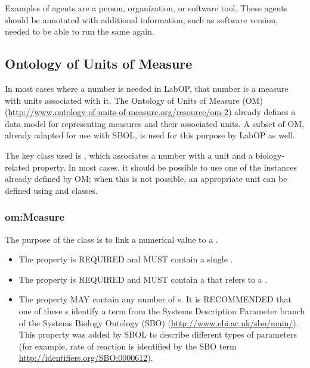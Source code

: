Examples of agents are a person, organization, or software tool. 
These agents should be annotated with additional information, such as software version, needed to be able to run the same  again.



\subsection{Ontology of Units of Measure}

In most cases where a number is needed in LabOP, that number is a measure with units associated with it.
The Ontology of Units of Measure (OM) (\url{http://www.ontology-of-units-of-measure.org/resource/om-2}) already defines a data model for representing measures and their associated units. 
A subset of OM, already adapted for use with SBOL, is used for this purpose by LabOP as well.

The key class used is , which associates a number with a unit and a biology-related property.
In most cases, it should be possible to use one of the  instances already defined by OM; when this is not possible, an appropriate unit can be defined using  and  classes.

\subsubsection{om:Measure} \label{sec:om:Measure}

The purpose of the  class is to link a numerical value to a . 

\begin{itemize}
\item \label{sec:om:hasNumericalValue}
The  property is REQUIRED and MUST contain a single .

\item \label{sec:om:hasUnit:Measure}
The  property is REQUIRED and MUST contain a  that refers to a . 

\item \label{sec:sbol:type:Measure}
The  property MAY contain any number of s. It is RECOMMENDED that one of these s identify a term from the Systems Description Parameter branch of the Systems Biology Ontology (SBO) (\url{http://www.ebi.ac.uk/sbo/main/}). This  property was added by SBOL to describe different types of parameters 
(for example, rate of reaction is identified by the SBO term \url{http://identifiers.org/SBO:0000612}).
\end{itemize}

